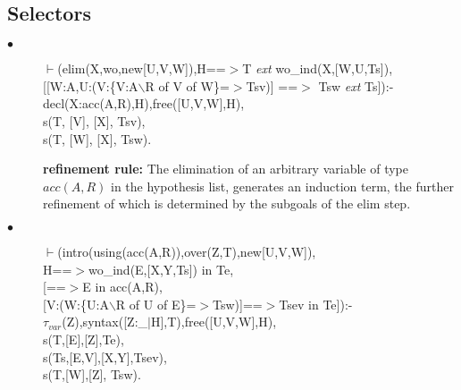 \documentclass[11pt]{report}
\begin{document}
 \subsection{Selectors}
  
 \begin{description}
 \item[$\bullet$]
\begin{sf}\begin{tabbing}
$\vdash$(elim(X,wo,new[U,V,W]),H==$>$T \mbox{\it ext} wo\_\hspace{0.1em}ind(X,[W,U,Ts]),\\[-0.15ex]
\hspace{2em}[[W:A,U:(V:\{V:A$\backslash$R of V of W\}=$>$Tsv)] ==$>$ Tsw \mbox{\it ext} Ts]):-\\[-0.15ex]
\hspace{2em}decl(X:acc(A,R),H),free([U,V,W],H), \\[-0.15ex]
\hspace{2em}s(T, [V], [X], Tsv),\\[-0.15ex]
\hspace{2em}s(T, [W], [X], Tsw).
\end{tabbing}\end{sf}

 {\bf refinement rule:} The elimination of an arbitrary variable of type
 $acc(A,R)$ in the hypothesis list, generates an induction term, the
 further refinement of which is determined by the subgoals of the elim step.
 \item[$\bullet$]
\begin{sf}\begin{tabbing}
$\vdash$(intro(using(acc(A,R)),over(Z,T),new[U,V,W]),\\[-0.15ex]
\hspace{2em}H==$>$wo\_\hspace{0.1em}ind(E,[X,Y,Ts]) in Te,\\[-0.15ex]
\hspace{2em}[==$>$E in acc(A,R),\\[-0.15ex]
\hspace{2em}[V:(W:\{U:A$\backslash$R of U of E\}=$>$Tsw)]==$>$Tsev in Te]):-\\[-0.15ex]
\hspace{2em}$\tau_{var}$(Z),syntax([Z:\_\hspace{0.1em}$\mid$H],T),free([U,V,W],H),\\[-0.15ex]
\hspace{2em}s(T,[E],[Z],Te),\\[-0.15ex]
\hspace{2em}s(Ts,[E,V],[X,Y],Tsev),\\[-0.15ex]
\hspace{2em}s(T,[W],[Z], Tsw).
\end{tabbing}\end{sf}


\end{description}
\end{document}
